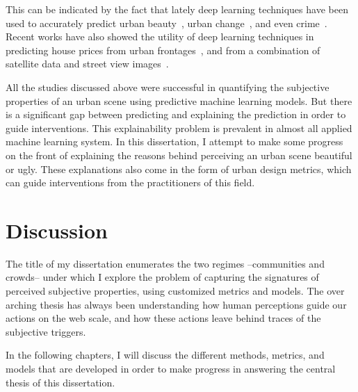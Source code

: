 This can be indicated by the fact that lately deep learning techniques have been used to accurately predict urban beauty~\cite{dubey2016deep,seresinhe2017using}, urban change~\cite{naik2017computer}, and even crime~\cite{DeNadai16,arietta2014city}.  Recent works have also showed the utility of deep learning techniques in predicting house prices from urban frontages~\cite{frontage}, and from a combination of satellite data and street view images~\cite{law2019take}.

All the studies discussed above were successful in quantifying the subjective properties of an urban scene using predictive machine learning models. But there is a significant gap between predicting and explaining the prediction in order to guide interventions. This explainability problem is prevalent in almost all applied machine learning system. In this dissertation, I attempt to make some progress on the front of explaining the reasons behind perceiving an urban scene beautiful or ugly. These explanations also come in the form of urban design metrics, which can guide interventions from the practitioners of this field.

\section{Discussion}

The title of my dissertation enumerates the two regimes --communities and crowds-- under which I explore the problem of capturing the signatures of perceived subjective properties, using customized metrics and models. The over arching thesis has always been understanding how human perceptions guide our actions on the web scale, and how these actions leave behind traces of the subjective triggers.

In the following chapters, I will discuss the different methods, metrics, and models that are developed in order to make progress in answering the central thesis of this dissertation.


